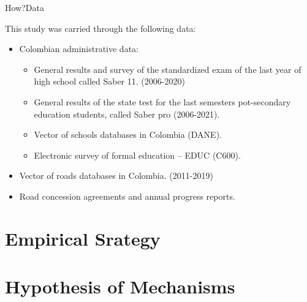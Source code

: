 \documentclass[9pt]{beamer}
\begin{document}
\begin{frame}{How?}{Data}
\label{data}

\justifying 

This study was carried through the following data:
\begin{itemize}
\justifying 
\item Colombian administrative data:
\begin{itemize}
      \item General results and survey of the standardized exam of the last year of high school called Saber 11. (2006-2020) \hyperlink{education}{}\label{contribution} %
       \item General results of the state test for the last semesters pot-secondary education students, called Saber pro (2006-2021).  %
       \item Vector of schools databases in Colombia (DANE).  
    \item  Electronic survey of formal education – EDUC (C600).     
\end{itemize}
  
    \item Vector of roads databases in Colombia. (2011-2019)
    
    \item  Road concession agreements and annual progress reports.
\end{itemize}

\end{frame}
\section{Empirical Srategy}

 \section{Hypothesis of Mechanisms}

\end{document}
